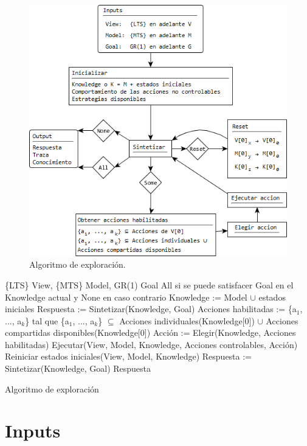 \begin{figure}[H]
  \centering
    \includegraphics[scale=0.8]{Imagenes/Algoritmo/Algoritmo.png}
  \caption{Algoritmo de exploración.}
  \label{fig:Algoritmo}
\end{figure}

\begin{algorithm}
\begin{algorithmic}
\REQUIRE \{LTS\} View, \{MTS\} Model, GR(1) Goal
\ENSURE All si se puede satisfacer Goal en el Knowledge actual y None en caso contrario
\STATE Knowledge := Model $\cup$ estados iniciales
\STATE Respuesta := Sintetizar(Knowledge, Goal)
\STATE Acciones habilitadas := \{a$_{1}$, ..., a$_{k}$\} tal que \{a$_{1}$, ..., a$_{k}$\} $\subseteq$ Acciones individuales(Knowledge[0]) $\cup$ Acciones compartidas disponibles(Knowledge[0])
\STATE Acción := Elegir(Knowledge, Acciones habilitadas)
\STATE Ejecutar(View, Model, Knowledge, Acciones controlables, Acción)
\ELSE
\STATE Reiniciar estados iniciales(View, Model, Knowledge)
\ENDIF
\STATE Respuesta := Sintetizar(Knowledge, Goal)
\ENDWHILE
\RETURN Respuesta
\end{algorithmic}
\caption{Algoritmo de exploración}
\end{algorithm}

\section{Inputs}

